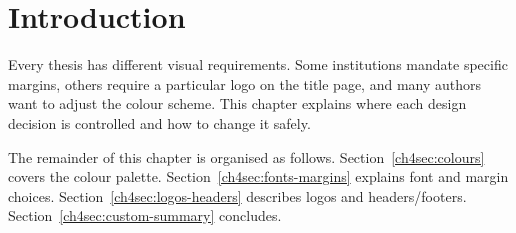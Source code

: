 \section{Introduction}\label{ch4sec:custom-intro}

Every thesis has different visual requirements. Some institutions mandate specific margins, others require a particular logo on the title page, and many authors want to adjust the colour scheme. This chapter explains where each design decision is controlled and how to change it safely.

\begin{figure}[t]
\centering
{}
\label{ch4fig:overview}
\end{figure}

The remainder of this chapter is organised as follows. Section~\ref{ch4sec:colours} covers the colour palette. Section~\ref{ch4sec:fonts-margins} explains font and margin choices. Section~\ref{ch4sec:logos-headers} describes logos and headers/footers. Section~\ref{ch4sec:custom-summary} concludes.
